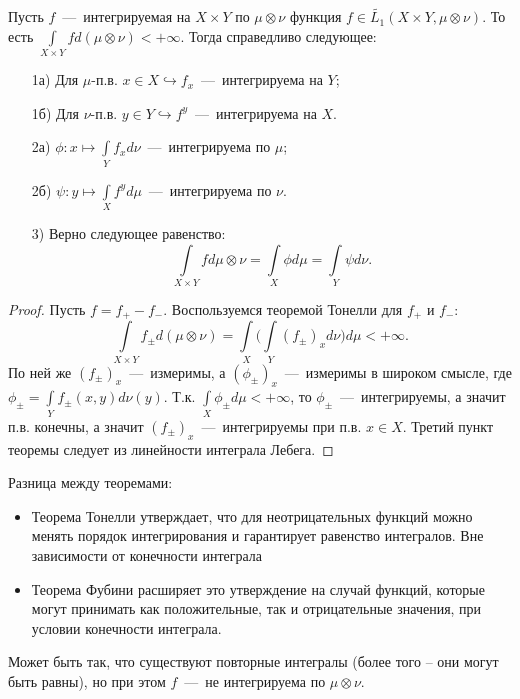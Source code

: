 \begin{theorem}[Фубини]
    Пусть $f$~---~интегрируемая на $X \times Y$ по $\mu \otimes \nu$ функция $f \in \widetilde{L_1}(X \times Y, \mu \otimes \nu)$. То есть $\int\limits_{X\times Y} f d(\mu \otimes \nu) < +\infty$. Тогда справедливо следующее:
    \begin{enumerate}
        \item[1а)] Для $\mu$-п.в. $x \in X \hookrightarrow f_x$~---~интегрируема на $Y$;
        \item[1б)] Для $\nu$-п.в. $y \in Y \hookrightarrow f^y$~---~интегрируема на $X$.
        \item[2а)] $\phi: x \mapsto \int\limits_Y f_xd\nu$~---~интегрируема по $\mu$;
        \item[2б)] $\psi: y \mapsto \int\limits_X f^yd\mu$~---~интегрируема по $\nu$.
        \item[3)] Верно следующее равенство: \[\int\limits_{X \times Y}fd\mu\otimes\nu = \int\limits_X \phi d\mu = \int\limits_Y \psi d\nu.\]
    \end{enumerate}
\end{theorem}
\begin{proof}
    Пусть $f = f_+ - f_-$. Воспользуемся теоремой Тонелли для $f_+$ и $f_-$: \[\int\limits_{X \times Y}f_\pm d(\mu\otimes\nu) = \int\limits_X\biggl(\int\limits_Y (f_\pm)_xd\nu \biggr)d\mu < +\infty.\]
    По ней же $(f_\pm)_x$~---~измеримы, а $(\phi_\pm)_x$~---~измеримы в широком смысле, где $\phi_\pm = \int\limits_Y f_\pm(x, y) d\nu(y)$. Т.к. $\int\limits_X \phi_\pm d\mu < +\infty$, то $\phi_\pm$~---~интегрируемы, а значит п.в. конечны, а значит $(f_\pm)_x$~---~интегрируемы при п.в. $x \in X$. Третий пункт теоремы следует из линейности интеграла Лебега.
\end{proof}
\begin{note}
    Разница между теоремами:
    \begin{itemize}
        \item     Теорема Тонелли утверждает, что для неотрицательных функций можно менять порядок интегрирования и гарантирует равенство интегралов. Вне зависимости от конечности интеграла
        \item Теорема Фубини расширяет это утверждение на случай функций, которые могут принимать как положительные, так и отрицательные значения, при условии конечности интеграла.
    \end{itemize}
\end{note}
\begin{note}
    Может быть так, что существуют повторные интегралы (более того -- они могут быть равны), но при этом $f$~---~не интегрируема по $\mu \otimes \nu$.
\end{note}
